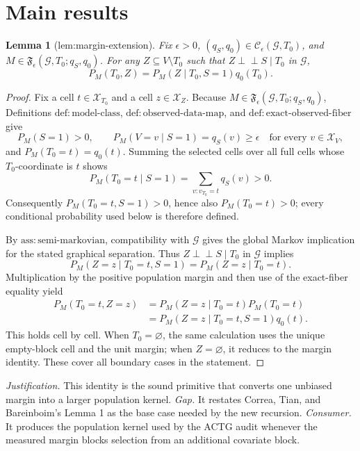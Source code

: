 \documentclass{article}
\newtheorem{lemma}{Lemma}
\begin{document}
\section{Main results}

\begin{lemma}[lem:margin-extension]\label{lem:margin-extension}
Fix \(\epsilon>0\), \((q_S,q_0)\in\mathcal C_{\epsilon}(\mathcal G,T_0)\), and \(M\in\mathfrak F_{\epsilon}(\mathcal G,T_0;q_S,q_0)\). For any \(Z\subseteq V\setminus T_0\) such that \(Z\perp\!\!\!\perp S\mid T_0\) in \(\mathcal G\), \[P_M(T_0,Z)=P_M(Z\mid T_0,S=1)q_0(T_0).\]
\end{lemma}
\begin{proof}
Fix a cell \(t\in\mathcal X_{T_0}\) and a cell \(z\in\mathcal X_Z\).  Because \(M\in\mathfrak F_{\epsilon}(\mathcal G,T_0;q_S,q_0)\), Definitions \(\mathrm{def{:}model\text{-}class}\), \(\mathrm{def{:}observed\text{-}data\text{-}map}\), and \(\mathrm{def{:}exact\text{-}observed\text{-}fiber}\) give
\[
 P_M(S=1)>0,\qquad P_M(V=v\mid S=1)=q_S(v)\geq\epsilon
 \quad\text{for every }v\in\mathcal X_V,
\]
and \(P_M(T_0=t)=q_0(t)\).  Summing the selected cells over all full cells whose \(T_0\)-coordinate is \(t\) shows
\[
 P_M(T_0=t\mid S=1)
 =\sum_{v:v_{T_0}=t}q_S(v)>0.
\]
Consequently \(P_M(T_0=t,S=1)>0\), hence also \(P_M(T_0=t)>0\); every conditional probability used below is therefore defined.

By \(\mathrm{ass{:}semi\text{-}markovian}\), compatibility with \(\mathcal G\) gives the global Markov implication for the stated graphical separation.  Thus \(Z\perp\!\!\!\perp S\mid T_0\) in \(\mathcal G\) implies
\[
 P_M(Z=z\mid T_0=t,S=1)=P_M(Z=z\mid T_0=t).
\]
Multiplication by the positive population margin and then use of the exact-fiber equality yield
\[
 \begin{aligned}
 P_M(T_0=t,Z=z)
 &=P_M(Z=z\mid T_0=t)P_M(T_0=t)\\
 &=P_M(Z=z\mid T_0=t,S=1)q_0(t).
 \end{aligned}
\]
This holds cell by cell.  When \(T_0=\varnothing\), the same calculation uses the unique empty-block cell and the unit margin; when \(Z=\varnothing\), it reduces to the margin identity.  These cover all boundary cases in the statement.
\end{proof}
\par\smallskip\noindent \textit{Justification.} This identity is the sound primitive that converts one unbiased margin into a larger population kernel. \textit{Gap.} It restates Correa, Tian, and Bareinboim's Lemma 1 as the base case needed by the new recursion. \textit{Consumer.} It produces the population kernel used by the ACTG audit whenever the measured margin blocks selection from an additional covariate block.
\end{document}
